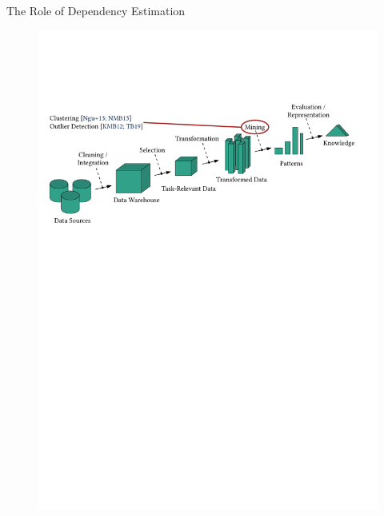 \documentclass[16pt,usenames,dvipsnames, notheorems]{beamer}
\theoremstyle{definition}
\theoremstyle{example}
\theoremstyle{plain}
\begin{document}
\begin{frame}{The Role of Dependency Estimation}
\begin{figure}
\begin{overprint}
		 \includegraphics[width=0.98\linewidth]{figures/kdd_r4-compressed.pdf}

\end{overprint}
\end{figure}
\end{frame}
\end{document}
